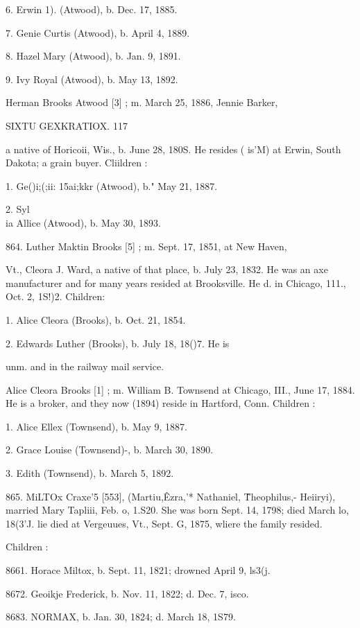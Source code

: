 \documentclass{book}
\begin{document}
6. Erwin 1). (Atwood), b. Dec. 17, 1885. 

7. Genie Curtis (Atwood), b. April 4, 1889. 

8. Hazel Mary (Atwood), b. Jan. 9, 1891. 

9. Ivy Royal (Atwood), b. May 13, 1892. 

Herman Brooks Atwood [3] ; m. March 25, 1886, Jennie Barker, 



SIXTU GEXKRATIOX. 117 

a native of Horicoii, Wis., b. June 28, 180S. He resides ( is'M) 
at Erwin, South Dakota; a grain buyer. Cliildren : 

1. Ge()i;(;ii: 15ai;kkr (Atwood), b." May 21, 1887. 

2. Syl\\ia Allice (Atwood), b. May 30, 1893. 

864. Luther Maktin Brooks [5] ; m. Sept. 17, 1851, at New Haven, 

Vt., Cleora J. Ward, a native of that place, b. July 23, 1832. 
He was an axe manufacturer and for many years resided at 
Brooksville. He d. in Chicago, 111., Oct. 2, 1S!)2. Children: 

1. Alice Cleora (Brooks), b. Oct. 21, 1854. 

2. Edwards Luther (Brooks), b. July 18, 18()7. He is 

unm. and in the railway mail service. 

Alice Cleora Brooks [1] ; m. William B. Townsend at Chicago, 
III., June 17, 1884. He is a broker, and they now (1894) reside 
in Hartford, Conn. Children : 

1. Alice Ellex (Townsend), b. May 9, 1887. 

2. Grace Louise (Townsend)-, b. March 30, 1890. 

3. Edith (Townsend), b. March 5, 1892. 

865. MiLTOx Craxe'5 [553], (Martiu,\^ Ezra,'* Nathaniel, \^ 
Theophilus,- Heiiryi), married Mary Tapliii, Feb. o, 1.S20. She 
was born Sept. 14, 1798; died March lo, 18(3'J. lie died at 
Vergeuues, Vt., Sept. G, 1875, wliere the family resided. 

Children : 

8661. Horace Miltox, b. Sept. 11, 1821; drowned April 9, ls3(j. 

8672. Geoikje Frederick, b. Nov. 11, 1822; d. Dec. 7, isco. 

8683. NORMAX, b. Jan. 30, 1824; d. March 18, 1S79. 
\end{document}
